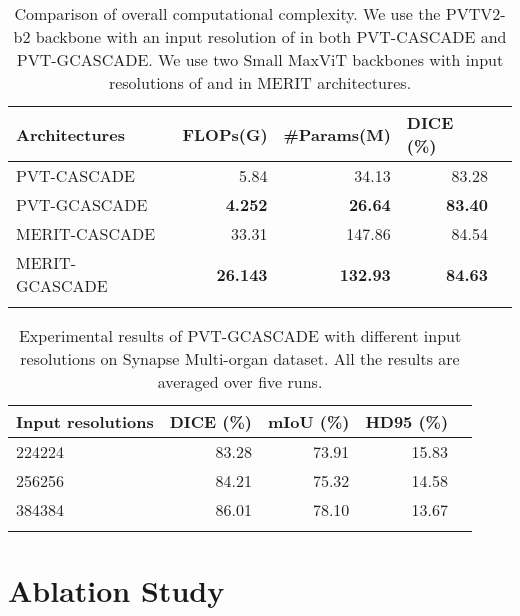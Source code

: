 \documentclass[10pt,twocolumn,letterpaper]{article}
\begin{document}
\begin{table}[t]
\color{black}
\centering 
    {\begin{adjustbox}{width=0.48\textwidth}
{\begin{tabular}{lrrrr}
\toprule
Architectures      &  \multicolumn{1}{c}{FLOPs(G)} & \multicolumn{1}{c}{\#Params(M)} & \multicolumn{1}{l}{DICE (\%)} \\
\midrule
PVT-CASCADE                       & 5.84 & 34.13 & 83.28  \\
PVT-GCASCADE                        & \textbf{4.252} & \textbf{26.64} & \textbf{83.40}      \\
\midrule 
MERIT-CASCADE                                 & 33.31 & 147.86 & 84.54   \\
MERIT-GCASCADE                   & \textbf{26.143} & \textbf{132.93}     & \textbf{84.63}   \\
\bottomrule \\
\end{tabular}}
\end{adjustbox}

}\caption{Comparison of overall computational complexity. We use the PVTV2-b2 backbone with an input resolution of  in both PVT-CASCADE and PVT-GCASCADE. We use two Small MaxViT backbones with input resolutions of  and  in MERIT architectures.}
\label{tab:overall_computational_complexity_comparision}
\color{black}
\end{table}

\begin{table}[]
\centering 
    {{\begin{tabular}{lrrrr}
\toprule
Input resolutions   & \multicolumn{1}{l}{DICE (\%)} & \multicolumn{1}{l}{mIoU (\%)} & \multicolumn{1}{l}{HD95 (\%)} \\
\midrule
224224 & 83.28  &  73.91 & 15.83\\
256256 & 84.21  &  75.32 & 14.58 \\
384384 & 86.01   & 78.10  &  13.67 \\
\bottomrule \\
\end{tabular}}


}\caption{Experimental results of PVT-GCASCADE with different input resolutions on Synapse Multi-organ dataset. All the results are averaged over five runs.}
\label{tab:different_input_resolutions}
\end{table}

\section{Ablation Study}
\end{document}
